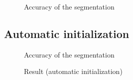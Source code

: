 \begin{figure} \centering
  \caption{Accuracy of the segmentation}
\end{figure}


\subsection{Automatic initialization}
 \begin{figure} \centering
  \caption{Accuracy of the segmentation}
\end{figure}


 \begin{figure} \centering
  \caption{Result (automatic initialization)}
\end{figure}



